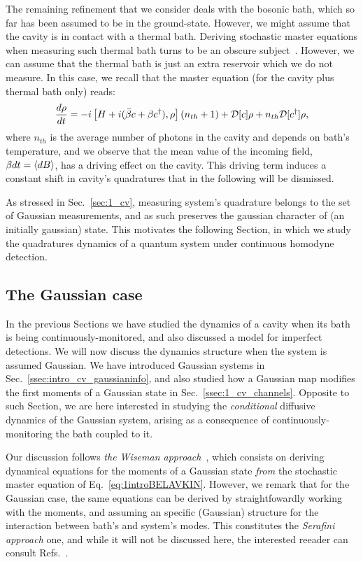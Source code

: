 The remaining refinement that we consider deals with the bosonic bath, which so far has been assumed to be in the ground-state. However, we might assume that the cavity is in contact with a thermal bath. Deriving stochastic master equations when measuring such thermal bath turns to be an obscure subject~\cite{wisemanbook,jacobs_2014}. However, we can assume that the thermal bath is just an extra reservoir which we do not measure. In this case, we recall that the master equation (for the cavity plus thermal bath only) reads:
\begin{align}\label{eq:master_thermal}
\frac{d\rho}{dt} = -i\left[H + i(\bar{\beta} c + \beta c^\dagger),\rho\right] (n_{th}+1) + \mathcal{D}[c] \rho + n_{th} \mathcal{D}[c^\dagger] \rho,
\end{align}
where $n_{th}$ is the average number of photons in the cavity and depends on bath's temperature, and we observe that the mean value of the incoming field, $\beta dt = \mathinner{\langle dB\rangle}$, has a driving effect on the cavity\cite{wisemanbook}. This driving term induces a constant shift in cavity's quadratures that in the following will be dismissed.

As stressed in Sec.~\ref{sec:1_cv}, measuring system's quadrature belongs to the set of Gaussian measurements, and as such preserves the gaussian character of (an initially gaussian) state. This motivates the following Section, in which we study the quadratures dynamics of a quantum system under continuous homodyne detection.

\subsection{The Gaussian case}\label{ssec:1_cmon_gaussian}
In the previous Sections we have studied the dynamics of a cavity when its bath is being continuously-monitored, and also discussed a model for imperfect detections. We will now discuss the dynamics structure when the system is assumed Gaussian. We have introduced Gaussian systems in Sec.~\ref{ssec:intro_cv_gaussianinfo}, and also studied how a Gaussian map modifies the first moments of a Gaussian state in Sec.~\ref{ssec:1_cv_channels}. Opposite to such Section, we are here interested in studying the \textit{conditional} diffusive dynamics of the Gaussian system, arising as a consequence of continuously-monitoring the bath coupled to it.

Our discussion follows \textit{the Wiseman approach}~\cite{wisemanbook,Wiseman2005optimal,wiseman1993interpretation}, which consists on deriving dynamical equations for the moments of a Gaussian state \textit{from} the stochastic master equation of Eq.~\ref{eq:1introBELAVKIN}. However, we remark that for the Gaussian case, the same equations can be derived by straightfowardly working with the moments, and assuming an specific (Gaussian) structure for the interaction between bath's and system's modes. This constitutes the \textit{Serafini approach} one, and while it will not be discussed here, the interested reeader can consult Refs.~\cite{serafiniBOOK,Genoni2016conditional}.

